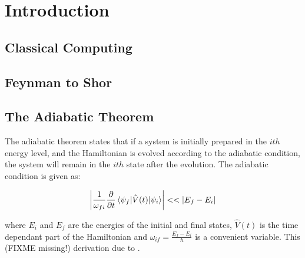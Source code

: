\chapter{Introduction}

\section{Classical Computing}

\section{Feynman to Shor}

\section{The Adiabatic Theorem}
The adiabatic theorem states that if a system is initially prepared in the $ith$ energy level, and the Hamiltonian is evolved according to the adiabatic condition, the system will remain in the $ith$ state after the evolution.  The adiabatic condition is given as:

\begin{displaymath}
	\left | \frac{1}{\omega_{fi}}\frac{\partial}{\partial t} \mathinner{\langle{\psi_f | \hat{V}(t) | \psi_i}\rangle} \right | << |E_f - E_i|
\end{displaymath}

where $E_i$ and $E_f$ are the energies of the initial and final states, $\hat{V}(t)$ is the time dependant part of the Hamiltonian and $\omega_{if} = \frac{E_f - E_i}{\hbar}$ is a convenient variable.  This (FIXME missing!) derivation due to \cite{zettili}.
